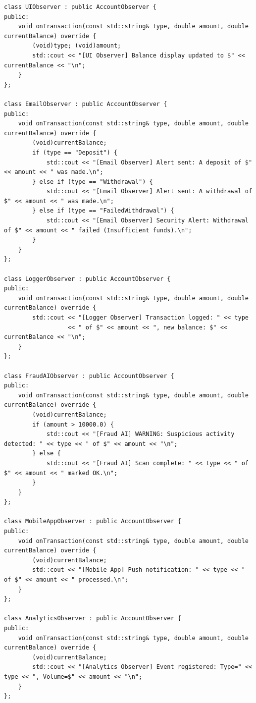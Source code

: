 \documentclass[12pt,a4paper]{article}
\begin{document}
\newpage
\begin{lstlisting}[caption=Concrete Observer Implementations]
class UIObserver : public AccountObserver {
public:
    void onTransaction(const std::string& type, double amount, double currentBalance) override {
        (void)type; (void)amount;
        std::cout << "[UI Observer] Balance display updated to $" << currentBalance << "\n";
    }
};

class EmailObserver : public AccountObserver {
public:
    void onTransaction(const std::string& type, double amount, double currentBalance) override {
        (void)currentBalance;
        if (type == "Deposit") {
            std::cout << "[Email Observer] Alert sent: A deposit of $" << amount << " was made.\n";
        } else if (type == "Withdrawal") {
            std::cout << "[Email Observer] Alert sent: A withdrawal of $" << amount << " was made.\n";
        } else if (type == "FailedWithdrawal") {
            std::cout << "[Email Observer] Security Alert: Withdrawal of $" << amount << " failed (Insufficient funds).\n";
        }
    }
};

class LoggerObserver : public AccountObserver {
public:
    void onTransaction(const std::string& type, double amount, double currentBalance) override {
        std::cout << "[Logger Observer] Transaction logged: " << type 
                  << " of $" << amount << ", new balance: $" << currentBalance << "\n";
    }
};

class FraudAIObserver : public AccountObserver {
public:
    void onTransaction(const std::string& type, double amount, double currentBalance) override {
        (void)currentBalance;
        if (amount > 10000.0) {
            std::cout << "[Fraud AI] WARNING: Suspicious activity detected: " << type << " of $" << amount << "\n";
        } else {
            std::cout << "[Fraud AI] Scan complete: " << type << " of $" << amount << " marked OK.\n";
        }
    }
};

class MobileAppObserver : public AccountObserver {
public:
    void onTransaction(const std::string& type, double amount, double currentBalance) override {
        (void)currentBalance;
        std::cout << "[Mobile App] Push notification: " << type << " of $" << amount << " processed.\n";
    }
};

class AnalyticsObserver : public AccountObserver {
public:
    void onTransaction(const std::string& type, double amount, double currentBalance) override {
        (void)currentBalance;
        std::cout << "[Analytics Observer] Event registered: Type=" << type << ", Volume=$" << amount << "\n";
    }
};
\end{lstlisting}
\end{document}
